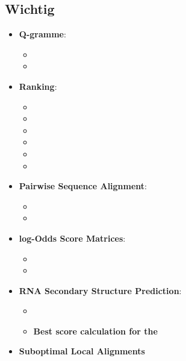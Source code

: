 \subsection*{Wichtig}

\begin{itemize}
    \item \textbf{Q-gramme}:
    \begin{itemize}
        \item {}
        \item {}
    \end{itemize}
    \item \textbf{Ranking}:
    \begin{itemize}
        \item {}
        \item {}
        \item {}
        \item {}
        \item {}
        \item {}
    \end{itemize}
    \item \textbf{Pairwise Sequence Alignment}:
    \begin{itemize}
        \item {}
        \item {}
    \end{itemize}
    \item \textbf{log-Odds Score Matrices}:
    \begin{itemize}
        \item  {}
        \item {}
    \end{itemize}
    \item \textbf{RNA Secondary Structure Prediction}:
    \begin{itemize}
        \item {}
        \item \textbf{Best score calculation for the} 
    \end{itemize}
    \item \textbf{Suboptimal Local Alignments}
    \begin{itemize}

\end{itemize}
\end{itemize}
